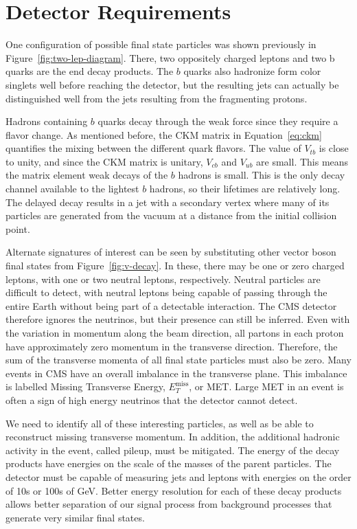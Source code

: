 \section{Detector Requirements} \label{sec:requirements}

One configuration of possible final state particles was shown previously
in Figure~\ref{fig:two-lep-diagram}.
There, two oppositely charged leptons and two b quarks are the end decay products.
The $b$ quarks also hadronize form color singlets well before reaching the detector,
but the resulting jets can actually be distinguished well from the jets resulting
from the fragmenting protons.

Hadrons containing $b$ quarks decay through the weak force
since they require a flavor change.
As mentioned before, the CKM matrix in Equation~\ref{eq:ckm}
quantifies the mixing between the different quark flavors.
The value of $V_{tb}$ is close to unity, and since the CKM matrix is unitary,
$V_{cb}$ and $V_{ub}$ are small.
This means the matrix element weak decays of the $b$ hadrons is small.
This is the only decay channel available to the lightest $b$ hadrons,
so their lifetimes are relatively long.
The delayed decay results in a jet with a secondary vertex where many of its particles
are generated from the vacuum at a distance from the initial collision point.

Alternate signatures of interest can be seen by substituting other vector boson final states
from Figure~\ref{fig:v-decay}.
In these, there may be one or zero charged leptons,
with one or two neutral leptons, respectively.
Neutral particles are difficult to detect,
with neutral leptons being capable of passing through the entire Earth without
being part of a detectable interaction.
The CMS detector therefore ignores the neutrinos,
but their presence can still be inferred.
Even with the variation in momentum along the beam direction,
all partons in each proton have approximately zero momentum in the transverse direction.
Therefore, the sum of the transverse momenta of all final state particles must also be zero.
Many events in CMS have an overall imbalance in the transverse plane.
This imbalance is labelled Missing Transverse Energy, $E^\textrm{miss}_T$, or MET.
Large MET in an event is often a sign of high energy neutrinos that the detector cannot detect.

We need to identify all of these interesting particles,
as well as be able to reconstruct missing transverse momentum.
In addition, the additional hadronic activity in the event, called pileup, must be mitigated.
The energy of the decay products have energies on the scale of the masses of the parent particles.
The detector must be capable of measuring jets and leptons with energies on the
order of 10s or 100s of GeV.
Better energy resolution for each of these decay products allows better separation
of our signal process from background processes that generate very similar final states.

